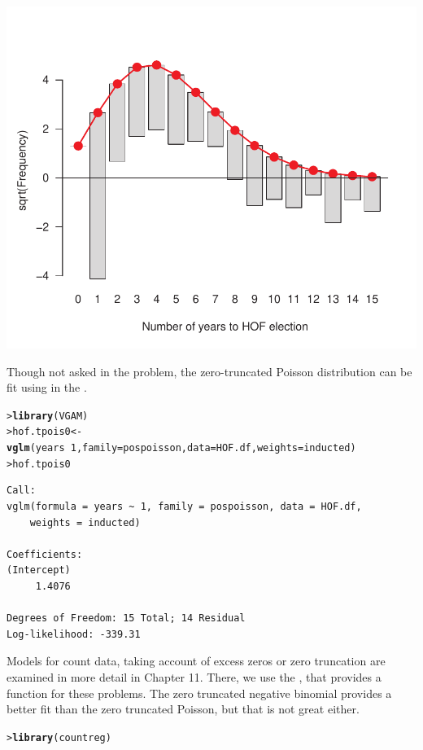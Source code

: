 \documentclass[10pt]{report}\usepackage[]{graphicx}\usepackage[]{color}
\makeatletter
\newcommand{\hlnum}[1]{\textcolor[rgb]{0.686,0.059,0.569}{#1}}%
\newcommand{\hlopt}[1]{\textcolor[rgb]{0,0,0}{#1}}%
\newcommand{\hlstd}[1]{\textcolor[rgb]{0.345,0.345,0.345}{#1}}%
\newcommand{\hlkwb}[1]{\textcolor[rgb]{0.69,0.353,0.396}{#1}}%
\newcommand{\hlkwc}[1]{\textcolor[rgb]{0.333,0.667,0.333}{#1}}%
\newcommand{\hlkwd}[1]{\textcolor[rgb]{0.737,0.353,0.396}{\textbf{#1}}}%
\newenvironment{kframe}{%
 \def\at@end@of@kframe{}%
 \ifinner\ifhmode%
  \def\at@end@of@kframe{\end{minipage}}%
  \begin{minipage}{\columnwidth}%
 \fi\fi%
 \def\FrameCommand##1{\hskip\@totalleftmargin \hskip-\fboxsep
 \colorbox{shadecolor}{##1}\hskip-\fboxsep
     \hskip-\linewidth \hskip-\@totalleftmargin \hskip\columnwidth}%
 \MakeFramed {\advance\hsize-\width
   \@totalleftmargin\z@ \linewidth\hsize
   \@setminipage}}%
 {\par\unskip\endMakeFramed%
 \at@end@of@kframe}
\newenvironment{knitrout}{}{} %
\renewenvironment{knitrout}{\small\renewcommand{\baselinestretch}{.85}}{} %
\makeatother
\begin{document}
\begin{Exercises}
\begin{enumerate*}
\begin{ans}
\begin{knitrout}
\centerline{\includegraphics[width=.5\textwidth]{soln/fig/ex3_12c-1} }



\end{knitrout}
      Though not asked in the problem, the zero-truncated Poisson distribution can be fit using 
      in the . %
\begin{knitrout}\footnotesize
{}\color{fgcolor}\begin{kframe}
\begin{alltt}
\hlstd{> }\hlkwd{library}\hlstd{(VGAM)}
\hlstd{> }\hlstd{hof.tpois0} \hlkwb{<-} \hlkwd{vglm}\hlstd{(years} \hlopt{~} \hlnum{1}\hlstd{,} \hlkwc{family}\hlstd{=pospoisson,} \hlkwc{data}\hlstd{=HOF.df,} \hlkwc{weights}\hlstd{=inducted)}
\hlstd{> }\hlstd{hof.tpois0}
\end{alltt}
\begin{verbatim}
Call:
vglm(formula = years ~ 1, family = pospoisson, data = HOF.df, 
    weights = inducted)

Coefficients:
(Intercept) 
     1.4076 

Degrees of Freedom: 15 Total; 14 Residual
Log-likelihood: -339.31 
\end{verbatim}
\end{kframe}
\end{knitrout}
      Models for count data, taking account of excess zeros or zero truncation are examined in more detail
      in Chapter 11.  There, we use the , that provides a  function for these
      problems.  The zero truncated negative binomial provides a better fit than the zero truncated Poisson,
      but that is not great either.
\begin{knitrout}\footnotesize
{}\color{fgcolor}\begin{kframe}
\begin{alltt}
\hlstd{> }\hlkwd{library}\hlstd{(countreg)}
\end{alltt}



\end{kframe}
\end{knitrout}
\end{ans}
\end{enumerate*}
\end{Exercises}
\end{document}

